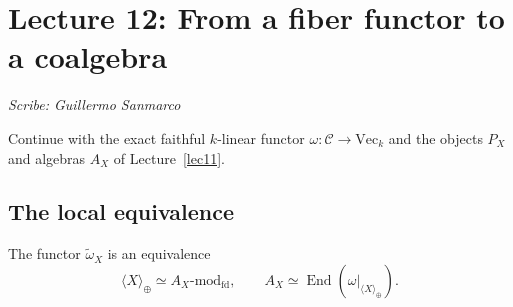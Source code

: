 \section{Lecture 12: From a fiber functor to a coalgebra}\label{lec12}
\noindent\textit{Scribe: Guillermo Sanmarco}


Continue with the exact faithful $k$-linear functor $\omega:\mathcal C\to\mathrm{Vec}_k$ and the objects $P_X$ and algebras $A_X$ of Lecture~\ref{lec11}.

\subsection*{The local equivalence}
\begin{theorem}\label{thm:local-abelian-reconstruction}
The functor $\widetilde\omega_X$ is an equivalence
\[
 \langle X\rangle_{\oplus}\simeq A_X\text{-}\mathrm{mod}_{\mathrm{fd}},
 \qquad
 A_X\simeq\operatorname{End}(\omega|_{\langle X\rangle_{\oplus}}).
\]
\end{theorem}
